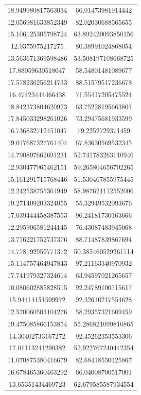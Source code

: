 \begin{table}
\begin{tabular}{cc}
18.949980817563034 & 66.01473981914442 \\
12.056981633852349 & 82.02030688565655 \\
15.106125305798724 & 63.892420093850156 \\
12.9375975217275 & 80.38991024868054 \\
13.563671369598486 & 53.508197108668725 \\
17.88059630518047 & 58.54801481089677 \\
17.578236256214733 & 88.51579517236678 \\
16.47423444466438 & 71.55417205475524 \\
18.842373804620923 & 63.75228195663801 \\
17.845033298261026 & 73.29475681933599 \\
16.736832712451047 & 79.2252729371459 \\
19.017687327761404 & 67.83630569532345 \\
14.790897662691231 & 52.741783263110946 \\
12.930477965462151 & 59.265804656702265 \\
15.161291715768446 & 51.530467855975445 \\
12.242538755361949 & 58.987621112552006 \\
19.271409203324055 & 55.32949532093676 \\
17.039444458387553 & 96.24181730163666 \\
12.295906581244145 & 76.43087483945068 \\
13.776221752737376 & 88.71487839867694 \\
14.778192959771312 & 50.385460529261714 \\
15.114757464947843 & 97.21163340970932 \\
17.741979327324614 & 63.94597021265657 \\
10.080602885828515 & 92.24789100715617 \\
15.94414151509972 & 92.32610217554628 \\
12.570060503104276 & 58.29357321609459 \\
19.475085866153854 & 55.286821099810865 \\
14.30402733167272 & 92.45262353553306 \\
17.01113241290382 & 52.922767240442354 \\
11.070875380416679 & 82.68418550125867 \\
16.678465360463292 & 66.04008700517001 \\
13.65351434469723 & 62.679585587934554 \\

\end{tabular}
\end{table}

